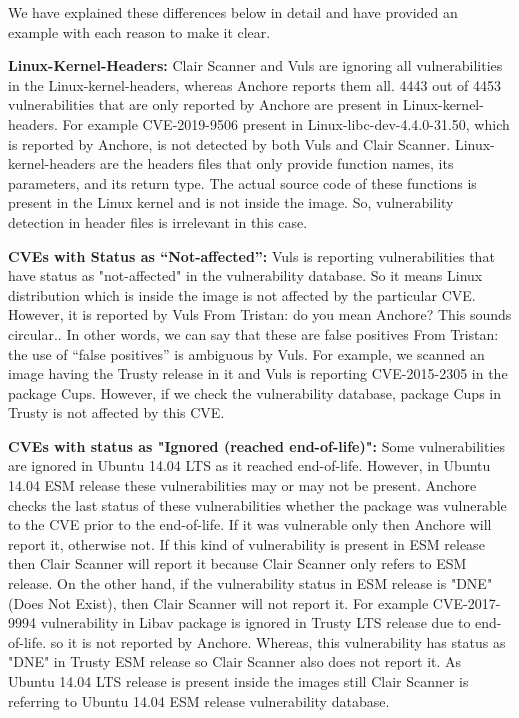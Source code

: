 \documentclass[a4paper,num-refs]{oup-contemporary}
\newcommand{\tristan}[1]{\color{blue}From Tristan: #1\color{black}}
\begin{document}
We have explained these differences below in detail
and have provided an example with each reason to make it clear.

\textbf{Linux-Kernel-Headers:} Clair Scanner and Vuls are ignoring all vulnerabilities in the Linux-kernel-headers,
whereas Anchore reports them all.
4443 out of 4453 vulnerabilities that are only reported by Anchore are present in Linux-kernel-headers.
For example CVE-2019-9506 present in Linux-libc-dev-4.4.0-31.50, which is reported by Anchore, is not
detected by both Vuls and Clair Scanner.
Linux-kernel-headers are the headers files that only provide function names, its parameters, and its
return type.
The actual source code of these functions is present in the Linux kernel and is not inside the image.
So, vulnerability detection in header files
is irrelevant in this case.

\textbf{CVEs with Status as “Not-affected”:} Vuls is reporting vulnerabilities that have status
as "not-affected" in the vulnerability database. So it means Linux distribution which is inside the image is not affected
by the particular CVE. However, it is reported by Vuls \tristan{do you mean Anchore? This sounds circular.}. In other words, we can say that
these are false positives \tristan{the use of ``false positives'' is ambiguous} by Vuls.
For example, we scanned an image having the Trusty release in it and Vuls is reporting CVE-2015-2305
in the package Cups. However, if we check the vulnerability database, package Cups in Trusty is not
affected by this CVE.

\textbf{CVEs with status as "Ignored (reached end-of-life)":}
Some vulnerabilities are ignored in Ubuntu 14.04 LTS as it reached end-of-life. 
However, in Ubuntu 14.04 ESM release these vulnerabilities may or may not be present.
Anchore checks the last status of these vulnerabilities whether the package was vulnerable to the CVE
prior to the end-of-life. If it was vulnerable only then Anchore will report it, otherwise not.
If this kind of vulnerability is present in ESM release then Clair Scanner will report it because Clair Scanner
only refers to ESM release. On the other hand, if the vulnerability
status in ESM release is "DNE" (Does Not Exist), then Clair Scanner will not report it. 
For example CVE-2017-9994 vulnerability in Libav package is ignored in Trusty LTS release due to end-of-life.
so it is not reported by Anchore. Whereas, this vulnerability has status as "DNE" in Trusty ESM
release so Clair Scanner also does not report it. As Ubuntu 14.04 LTS release is present inside the images still
Clair Scanner is referring to Ubuntu 14.04 ESM release vulnerability database.
\end{document}
